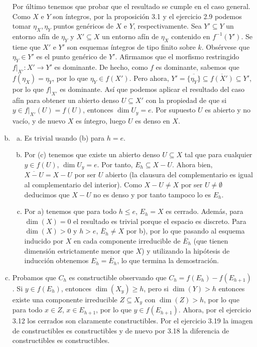 \documentclass[twoside]{article}
\begin{document}
\begin{solucion}
\begin{enumerate}[(a)]
Por último tenemos que probar que el resultado se cumple en el caso general. Como $X$ e $Y$ son íntegros, por la proposición 3.1 y el ejercicio 2.9 podemos tomar $\eta_X,\eta_Y$ puntos genéricos de $X$ e $Y$, respectivamente. Sea $Y'\subseteq Y$ un entorno afín de $\eta_Y$ y $X'\subseteq X$ un entorno afín de $\eta_X$ contenido en $f^{-1}(Y')$. Se tiene que $X'$ e $Y'$ son esquemas íntegros de tipo finito sobre $k$. Obsérvese que $\eta_Y\in Y'$ es el punto genérico de $Y'$. Afirmamos que el morfismo restringido $f|_{X'}:X'\to Y'$ es dominante. De hecho, como $f$ es dominante, sabemos que $f(\eta_X)=\eta_Y$, por lo que $\eta_Y\in f(X')$. Pero ahora, $Y'=\overline{\{\eta_Y\}}\subseteq \overline{f(X')}\subseteq Y'$, por lo que $f|_{X'}$ es dominante. Así que podemos aplicar el resultado del caso afín para obtener un abierto denso $U\subseteq X'$ con la propiedad de que si $y\in f|_{X'}(U)=f(U)$, entonces $\dim U_y=e$. Por supuesto $U$ es abierto y no vacío, y de nuevo $X$ es íntegro, luego $U$ es denso en $X$. 

\item \begin{enumerate}[a)]
\item Es trivial usando (b) para $h=e$. 
\item Por (c) tenemos que existe un abierto denso $U\subseteq X$ tal que para cualquier $y\in f(U)$, $\dim U_y=e$. Por tanto, $E_h\subseteq X-U$. Ahora bien, $\overline{X-U}=X-U$ por ser $U$ abierto (la clausura del complementario es igual al complementario del interior). Como $X-U\neq X$ por ser $U\neq\emptyset$ deducimos que $X-U$ no es denso y por tanto tampoco lo es $E_h$. 
\item Por a) tenemos que para todo $h\leq e$, $E_h=X$ es cerrado. Además, para $\dim(X)=0$ el resultado es trivial porque el espacio es discreto. Para $\dim(X)>0$ y $h>e$, $\overline{E}_h\neq X$ por b), por lo que pasando al esquema inducido por $X$ en cada componente irreducible de $\overline{E}_h$ (que tienen dimensión estrictamente menor que $X$) y utilizando la hipótesis de inducción obtenemos $E_h=\overline{E}_h$, lo que termina la demostración.
\end{enumerate}%

\item Probamos que $C_h$ es constructible observando que $C_h=f(E_h)-f(E_{h+1})$. Si $y\in f(E_h)$, entonces $\dim(X_y)\geq h$, pero si $\dim(Y)>h$ entonces existe una componente irreducible $Z\subseteq X_y$ con $\dim(Z)>h$, por lo que para todo $x\in Z$, $x\in E_{h+1}$, por lo que $y\in f(E_{h+1})$. Ahora, por el ejercicio 3.12 los cerrados son claramente constructibles. Por el ejercicio 3.19 la imagen de constructibles es constructibles y de nuevo por 3.18 la diferencia de constructibles es constructibles.


\end{enumerate}
\end{solucion}
\end{document}
